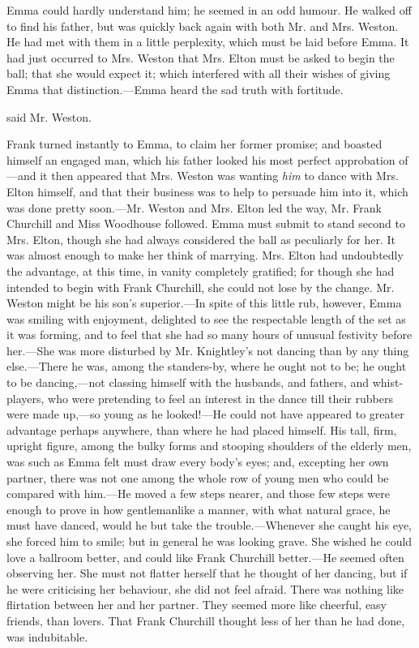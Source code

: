 Emma could hardly understand him; he seemed in an odd humour. He walked off to find his father, but was quickly back again with both Mr. and Mrs. Weston. He had met with them in a little perplexity, which must be laid before Emma. It had just occurred to Mrs. Weston that Mrs. Elton must be asked to begin the ball; that she would expect it; which interfered with all their wishes of giving Emma that distinction.---Emma heard the sad truth with fortitude.

 said Mr. Weston. 

Frank turned instantly to Emma, to claim her former promise; and boasted himself an engaged man, which his father looked his most perfect approbation of---and it then appeared that Mrs. Weston was wanting {\em him} to dance with Mrs. Elton himself, and that their business was to help to persuade him into it, which was done pretty soon.---Mr. Weston and Mrs. Elton led the way, Mr. Frank Churchill and Miss Woodhouse followed. Emma must submit to stand second to Mrs. Elton, though she had always considered the ball as peculiarly for her. It was almost enough to make her think of marrying. Mrs. Elton had undoubtedly the advantage, at this time, in vanity completely gratified; for though she had intended to begin with Frank Churchill, she could not lose by the change. Mr. Weston might be his son's superior.---In spite of this little rub, however, Emma was smiling with enjoyment, delighted to see the respectable length of the set as it was forming, and to feel that she had so many hours of unusual festivity before her.---She was more disturbed by Mr. Knightley's not dancing than by any thing else.---There he was, among the standers-by, where he ought not to be; he ought to be dancing,---not classing himself with the husbands, and fathers, and whist-players, who were pretending to feel an interest in the dance till their rubbers were made up,---so young as he looked!---He could not have appeared to greater advantage perhaps anywhere, than where he had placed himself. His tall, firm, upright figure, among the bulky forms and stooping shoulders of the elderly men, was such as Emma felt must draw every body's eyes; and, excepting her own partner, there was not one among the whole row of young men who could be compared with him.---He moved a few steps nearer, and those few steps were enough to prove in how gentlemanlike a manner, with what natural grace, he must have danced, would he but take the trouble.---Whenever she caught his eye, she forced him to smile; but in general he was looking grave. She wished he could love a ballroom better, and could like Frank Churchill better.---He seemed often observing her. She must not flatter herself that he thought of her dancing, but if he were criticising her behaviour, she did not feel afraid. There was nothing like flirtation between her and her partner. They seemed more like cheerful, easy friends, than lovers. That Frank Churchill thought less of her than he had done, was indubitable.

